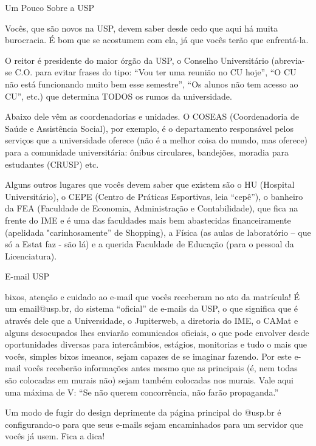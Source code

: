 \begin{secao}{Um Pouco Sobre a USP}

Vocês, que são novos na USP, devem saber desde cedo que aqui há muita
burocracia. É bom que se acostumem com ela, já que vocês terão que enfrentá-la.

O reitor é presidente do maior órgão da USP, o Conselho Universitário (abrevia-se
C.O. para evitar frases do tipo: ``Vou ter uma reunião no CU hoje'', ``O CU não
está funcionando muito bem esse semestre'', ``Os alunos não tem acesso ao CU'',
etc.) que determina TODOS os rumos da universidade.

Abaixo dele vêm as coordenadorias e unidades. O COSEAS (Coordenadoria de Saúde
e Assistência Social), por exemplo, é o departamento responsável pelos serviços
que a universidade oferece (não é a melhor coisa do mundo, mas oferece) para a
comunidade universitária: ônibus circulares, bandejões, moradia para estudantes
(CRUSP) etc.

Alguns outros lugares que vocês devem saber que existem são o HU (Hospital
Universitário), o CEPE (Centro de Práticas Esportivas, leia “cepê”), o banheiro
da FEA (Faculdade de Economia, Administração e Contabilidade), que fica na
frente do IME e é uma das faculdades mais bem abastecidas financeiramente
(apelidada "carinhosamente” de Shopping), a Física (as aulas de laboratório –
que só a Estat faz - são lá) e a querida Faculdade de Educação (para o pessoal
da Licenciatura).

\begin{subsecao}{E-mail USP}

bixos, atenção e cuidado ao e-mail que vocês receberam no ato da matrícula! É um
email@usp.br, do sistema “oficial” de e-mails da USP, o que significa que é
através dele que a Universidade, o Jupiterweb, a diretoria do IME, o CAMat e
alguns desocupados lhes enviarão comunicados oficiais, o que pode envolver desde
oportunidades diversas para intercâmbios, estágios, monitorias e tudo o mais que
vocês, simples bixos imeanos, sejam capazes de se imaginar fazendo. Por este e-mail
vocês receberão informações antes mesmo que as principais (é, nem todas são
colocadas em murais não) sejam também colocadas nos murais. Vale aqui uma máxima
de V: “Se não querem concorrência, não farão propaganda.”

Um modo de fugir do design deprimente da página principal do @usp.br é
configurando-o para que seus e-mails sejam encaminhados para um servidor que
vocês já usem. Fica a dica!

\end{subsecao}


\end{secao}
